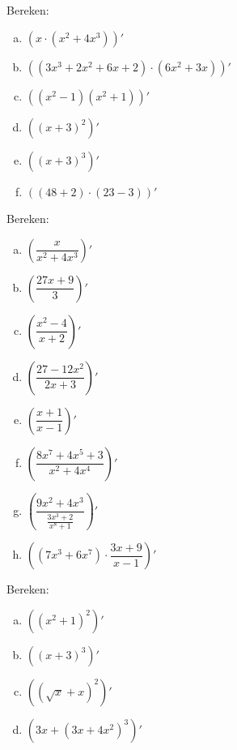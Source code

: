 \documentclass[a4paper,12pt,twoside]{article}
\begin{document}
\begin{oefening}
  Bereken:
  \begin{multicols}{2}
  \begin{enumerate}[(a)]
  \itemsep1em
  \item $\displaystyle\left( x\cdot(x^2+4x^3) \right)'$
  \item $\displaystyle\left( (3x^3+2x^2+6x+2)\cdot(6x^2+3x) \right)'$
  \item $\displaystyle\left( (x^2-1)(x^2+1) \right)'$
  \item $\displaystyle\left( (x+3)^2 \right)'$
  \item $\displaystyle\left( (x+3)^3 \right)'$
  \item $\displaystyle\left( (48+2)\cdot(23-3) \right)'$
  \end{enumerate}
  \end{multicols}
\end{oefening}

\begin{oefening}
  Bereken:
  \begin{multicols}{2}
  \begin{enumerate}[(a)]
  \itemsep1em
  \item $\displaystyle\left( \dfrac{x}{x^2+4x^3} \right)'$
  \item $\displaystyle\left( \dfrac{27x+9}{3} \right)'$
  \item $\displaystyle\left( \dfrac{x^2-4}{x+2} \right)'$
  \item $\displaystyle\left( \dfrac{27-12x^2}{2x+3} \right)'$
  \item $\displaystyle\left( \dfrac{x+1}{x-1} \right)'$
  \item $\displaystyle\left( \dfrac{8x^7+4x^5+3}{x^2+4x^4} \right)'$
  \item $\displaystyle\left( \dfrac{9x^2+4x^3}{\frac{3x^3+2}{x^8+1}} \right)'$
  \item $\displaystyle\left( (7x^3+6x^7)\cdot\dfrac{3x+9}{x-1} \right)'$
  \end{enumerate}
  \end{multicols}
\end{oefening}

\begin{oefening}
  Bereken:
  \begin{multicols}{2}
  \begin{enumerate}[(a)]
  \itemsep1em
  \item $\displaystyle\left( (x^2+1)^2 \right)'$
  \item $\displaystyle\left( (x+3)^3 \right)'$
  \item $\displaystyle\left( (\sqrt{x}+x)^2 \right)'$
  \item $\displaystyle\left( 3x+(3x+4x^2)^3 \right)'$
  \end{enumerate}
  \end{multicols}
\end{oefening}
\end{document}
